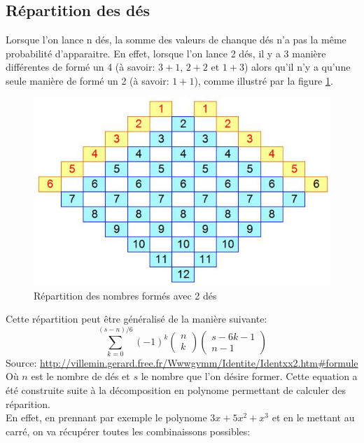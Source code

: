 \documentclass[letterpaper]{article}
\begin{document}
  \subsection{Répartition des dés}
    \label{repartition_des}
    Lorsque l'on lance n dés, la somme des valeurs de chanque dés n'a pas la même probabilité
    d'apparaitre.  En effet, lorsque l'on lance 2 dés, il y a 3 manière différentes de formé
    un 4 (à savoir: $3+1$, $2+2$ et $1+3$) alors qu'il n'y a qu'une seule manière de formé un 
    2 (à savoir: $1+1$), comme illustré par la figure \ref{tableau_repartition_des}.
    \begin{figure}[h]
      \centering
      \includegraphics[scale=0.4]{./Images/RepartitionDes.jpg}
	\caption{Répartition des nombres formés avec 2 dés \citep{IMG_Des}}
      \label{tableau_repartition_des}
    \end{figure}
    Cette répartition peut être généralisé de la manière suivante:
    $$\sum\limits_{k=0}^{(s-n)/6} (-1)^k \begin{pmatrix}n \\ k\end{pmatrix} 
      \begin{pmatrix}s-6k-1 \\n-1\end{pmatrix}$$
    Source: \url{http://villemin.gerard.free.fr/Wwwgvmm/Identite/Identxx2.htm\#formule}\\
    Où $n$ est le nombre de dés et $s$ le nombre que l'on désire former.  Cette equation
    a été construite suite à la décomposition en polynome permettant de calculer des
    réparition.\\
    En effet, en prennant par exemple le polynome $3x + 5x^2 + x^3$ et en le mettant au 
    carré, on va récupérer toutes les combinaissons possibles:
\end{document}
